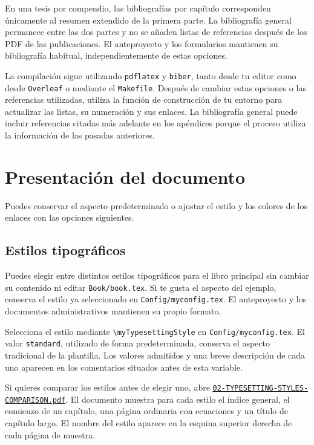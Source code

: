 En una tesis por compendio, las bibliografías por capítulo corresponden únicamente al resumen extendido de la primera parte. La bibliografía general permanece entre las dos partes y no se añaden listas de referencias después de los PDF de las publicaciones. El anteproyecto y los formularios mantienen su bibliografía habitual, independientemente de estas opciones.

La compilación sigue utilizando \texttt{pdflatex} y \texttt{biber}, tanto desde tu editor como desde \texttt{Overleaf} o mediante el \texttt{Makefile}. Después de cambiar estas opciones o las referencias utilizadas, utiliza la función de construcción de tu entorno para actualizar las listas, su numeración y sus enlaces. La bibliografía general puede incluir referencias citadas más adelante en los apéndices porque el proceso utiliza la información de las pasadas anteriores.

\section{Presentación del documento}

Puedes conservar el aspecto predeterminado o ajustar el estilo y los colores de los enlaces con las opciones siguientes.

\subsection{Estilos tipográficos}
\label{sec:estilos-tipograficos}

Puedes elegir entre distintos estilos tipográficos para el libro principal sin cambiar su contenido ni editar \texttt{Book/book.tex}. Si te gusta el aspecto del ejemplo, conserva el estilo ya seleccionado en \texttt{Config/myconfig.tex}. El anteproyecto y los documentos administrativos mantienen su propio formato.

Selecciona el estilo mediante \texttt{\textbackslash{}myTypesettingStyle} en \texttt{Config/myconfig.tex}. El valor \texttt{standard}, utilizado de forma predeterminada, conserva el aspecto tradicional de la plantilla. Los valores admitidos y una breve descripción de cada uno aparecen en los comentarios situados antes de esta variable.

Si quieres comparar los estilos antes de elegir uno, abre \href{https://www.dropbox.com/scl/fi/kl9geyh49na52yq1oy5hp/02-TYPESETTING-STYLES-COMPARISON.pdf?rlkey=ztygupln7j1fjhjsz1mlz4ky7&raw=1}{\nolinkurl{02-TYPESETTING-STYLES-COMPARISON.pdf}}. El documento muestra para cada estilo el índice general, el comienzo de un capítulo, una página ordinaria con ecuaciones y un título de capítulo largo. El nombre del estilo aparece en la esquina superior derecha de cada página de muestra.

